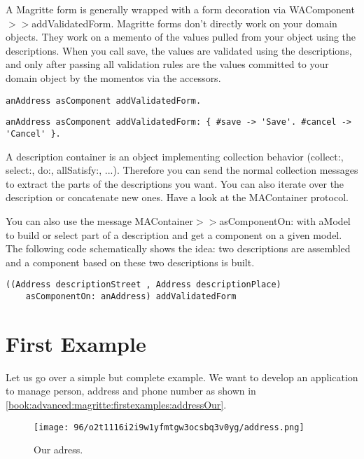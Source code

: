 \documentclass[a4paper,10pt,twoside]{book}
\newcommand{\ct}[1]{{\small\ttfamily\textup{#1}}}
\begin{document}
A Magritte form is generally wrapped with a form decoration via  \ct{WAComponent$>$$>$addValidatedForm}. Magritte forms don't directly work on your domain objects. They work on a memento of the values pulled from your object using the descriptions. When you call \ct{save}, the values are validated using the descriptions, and only after passing all validation rules are the values committed to your domain object by the momentos via the accessors.

\begin{lstlisting}
anAddress asComponent addValidatedForm.
\end{lstlisting}

\begin{lstlisting}
anAddress asComponent addValidatedForm: { #save -> 'Save'. #cancel -> 'Cancel' }.
\end{lstlisting}

A description container is an object implementing collection behavior (\ct{collect:}, \ct{select:}, \ct{do:}, \ct{allSatisfy:}, ...). Therefore you can send the normal collection messages to extract the parts of the descriptions you want. You can also iterate over the description or concatenate new ones. Have a look at the \ct{MAContainer} protocol.

You can also use the message  \ct{MAContainer$>$$>$asComponentOn:} with aModel to build or select part of a description and get a component on a given model. The following code schematically shows the idea: two descriptions are assembled and a component based on these two descriptions is built.

\begin{lstlisting}
((Address descriptionStreet , Address descriptionPlace) 
    asComponentOn: anAddress) addValidatedForm 
\end{lstlisting}

\section{First Example}
\label{book:advanced:magritte:firstexamples}

Let us go over a simple but complete example. We want to develop an application to manage person, address and phone number as shown in \autoref{book:advanced:magritte:firstexamples:addressOur}.

\begin{figure}[h!tbp]
	\begin{center}
		\texttt{[image: 96/o2t1116i2i9w1yfmtgw3ocsbq3v0yg/address.png]}
		\caption{Our adress.\label{book:advanced:magritte:firstexamples:addressOur}}
	\end{center}
\end{figure}
 
\end{document}
